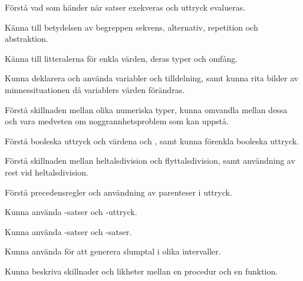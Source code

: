 
\item Förstå vad som händer när satser exekveras och uttryck evalueras.
\item Känna till betydelsen av begreppen sekvens, alternativ, repetition och abstraktion.
\item Känna till litteralerna för enkla värden, deras typer och omfång.
\item Kunna deklarera och använda variabler och tilldelning, samt kunna rita bilder av minnessituationen då variablers värden förändras.
\item Förstå skillnaden mellan olika numeriska typer, kunna omvandla mellan dessa och vara medveten om noggrannhetsproblem som kan uppstå.
\item Förstå booleska uttryck och värdena  och , samt kunna förenkla booleska uttryck.
\item Förstå skillnaden mellan heltalsdivision och flyttalsdivision, samt användning av rest vid heltalsdivision.
\item Förstå precedensregler och användning av parenteser i uttryck.
\item Kunna använda -satser och -uttryck.
\item Kunna använda -satser och -satser.
\item Kunna använda  för att generera slumptal i olika intervaller.
\item Kunna beskriva skillnader och likheter mellan en procedur och en funktion.
